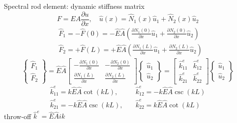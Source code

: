 \documentclass[10pt,aspectratio=169]{beamer} %
\begin{document}
\note{
}
\begin{frame}[t]{Spectral rod element: dynamic stiffness matrix}
\begin{equation*}
F= EA \frac{\partial u}{\partial x}, \quad \hat{u}(x) = \hat{N}_1(x) \hat{u}_1 + \hat{N}_2(x) \hat{u}_2
\end{equation*}
\begin{align*}
& \hat{F}_1 = -\hat{F}(0) = -\hat{E}\hat{A} \left( \frac{\partial N_1(0)}{\partial x} \hat{u}_1 +  \frac{\partial N_2(0)}{\partial x} \hat{u}_2 \right)\\
& \hat{F}_2 = +\hat{F}(L) = +\hat{E}\hat{A} \left( \frac{\partial N_1(L)}{\partial x} \hat{u}_1 +  \frac{\partial N_2(L)}{\partial x} \hat{u}_2 \right)
\end{align*}	
\begin{equation*}
\left\{
	\begin{array}{c}
	\hat{F}_1 \\ 
	\hat{F}_2 
	\end{array} 
	\right\} = \hat{E}\hat{A}  
     \left[  
     \begin{array}{rr}
      - \frac{\partial N_1(0)}{\partial x}  &  - \frac{\partial N_2(0)}{\partial x}  \\
       \frac{\partial N_1(L)}{\partial x}  &  \frac{\partial N_2(L)}{\partial x} 
       \end{array}
       \right]
       \left\{ \begin{array}{l}\hat{u}_1 \\ \hat{u}_2\end{array}\right\} = 
       \left[  \begin{array}{ll} \hat{k}_{11}^e & \hat{k}_{12}^e\\
       \hat{k}_{21}^e & \hat{k}_{22}^e \end{array}\right]
       \left\{ \begin{array}{l} \hat{u}_1 \\ \hat{u}_2\end{array}\right\}
\end{equation*}
\begin{equation*}
\begin{array}{ll}
 \hat{k}_{11}^e = k \hat{E}\hat{A} \cot (k L), \quad &\hat{k}_{12}^e = -k \hat{E}\hat{A} \csc (k L)\\
 \hat{k}_{21}^e =-k \hat{E}\hat{A} \csc (k L), \quad &\hat{k}_{22}^e = k \hat{E}\hat{A} \cot (k L)
\end{array}
\end{equation*}
throw-off \(\hat{k}^e = \hat{E} \hat{A} i k \)
\end{frame}
\end{document}
